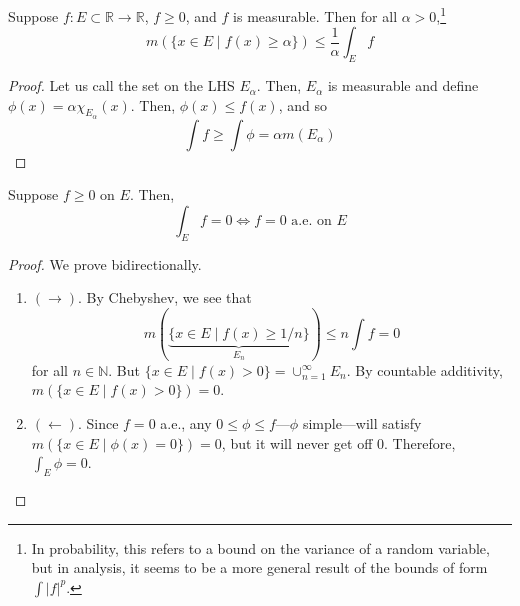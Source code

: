   \begin{lemma}[Chebyshev]
    \label{thm:chebyshev}
    Suppose $f: E \subset \mathbb{R} \to \mathbb{R}$, $f \geq 0$, and $f$ is measurable. Then for all $\alpha > 0$,\footnote{In probability, this refers to a bound on the variance of a random variable, but in analysis, it seems to be a more general result of the bounds of form $\int |f|^p$.} 
    \begin{equation}
      m( \{ x \in E \mid f(x) \geq \alpha\}) \leq \frac{1}{\alpha} \int_E f 
    \end{equation}
  \end{lemma}
  \begin{proof}
    Let us call the set on the LHS $E_\alpha$. Then, $E_\alpha$ is measurable and define $\phi(x) = \alpha \chi_{E_\alpha} (x)$. Then, $\phi(x) \leq f(x)$, and so 
    \begin{equation}
      \int f \geq \int \phi = \alpha m(E_\alpha)
    \end{equation}
  \end{proof}

  \begin{theorem}
    \label{thm:vanishing-integral-iff-a-e-vanishing}
    Suppose $f \geq 0$ on $E$. Then, 
    \begin{equation}
      \int_E f = 0 \iff f = 0 \text{ a.e. on } E
    \end{equation}
  \end{theorem}
  \begin{proof}
    We prove bidirectionally. 
    \begin{enumerate}
      \item $(\rightarrow)$. By Chebyshev, we see that 
        \begin{equation}
          m(\underbrace{\{ x \in E \mid f(x) \geq 1/n \}}_{E_n}) \leq n \int f = 0 
        \end{equation}
        for all $n \in \mathbb{N}$. But $\{x \in E \mid f(x) > 0\} = \cup_{n=1}^\infty E_n$. By countable additivity, $m(\{x \in E \mid f(x) > 0\}) = 0$. 

      \item $(\leftarrow)$. Since $f = 0$ a.e., any $0 \leq \phi \leq f$---$\phi$ simple---will satisfy $m(\{x \in E \mid \phi(x) = 0 \}) = 0$, but it will never get off $0$. Therefore, $\int_E \phi = 0$. 
    \end{enumerate}
  \end{proof}

